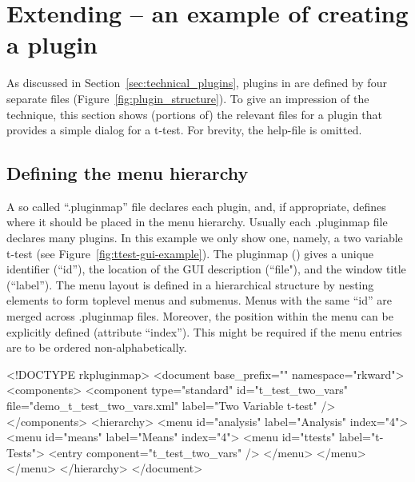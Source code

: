 \section[Extending RKWard -- an example of creating a plugin]{Extending  -- an example of creating a plugin}
\label{sec:example_plugin}
As discussed in Section~\ref{sec:technical_plugins}, plugins in  are
defined by four separate files (Figure~\ref{fig:plugin_structure}). To give an impression of the technique,
this section shows (portions of) the relevant files for a plugin that provides
a simple dialog for a t-test. For brevity, the help-file is omitted.

\subsection{Defining the menu hierarchy}
\label{sec:defining_menu_hierarchy}
A so called ``.pluginmap'' file declares each plugin, and, if appropriate, defines where it should
be placed in the menu hierarchy. Usually each .pluginmap file declares many plugins. In this example
we only show one, namely, a two variable t-test (see Figure~\ref{fig:ttest-gui-example}). 
The pluginmap () gives a unique identifier (``id''), the location of the
GUI description (``file"), and the window title (``label''). The menu layout is defined in a hierarchical
structure by nesting  elements to form toplevel menus and submenus. Menus with the same ``id''
are merged across .pluginmap files. Moreover, the position within the menu can be explicitly defined (attribute ``index'').
This might be required if the menu entries are to be ordered non-alphabetically.

\begin{footnotesize}
\begin{Code}
<!DOCTYPE rkpluginmap>
<document base_prefix="" namespace="rkward">
  <components>
    <component type="standard" id="t_test_two_vars"
          file="demo_t_test_two_vars.xml" label="Two Variable t-test" />
  </components>
  <hierarchy>
    <menu id="analysis" label="Analysis" index="4">
      <menu id="means" label="Means" index="4">
        <menu id="ttests" label="t-Tests">
          <entry component="t_test_two_vars" />
        </menu>
      </menu>
    </menu>
  </hierarchy>
</document>
\end{Code}
\end{footnotesize}


